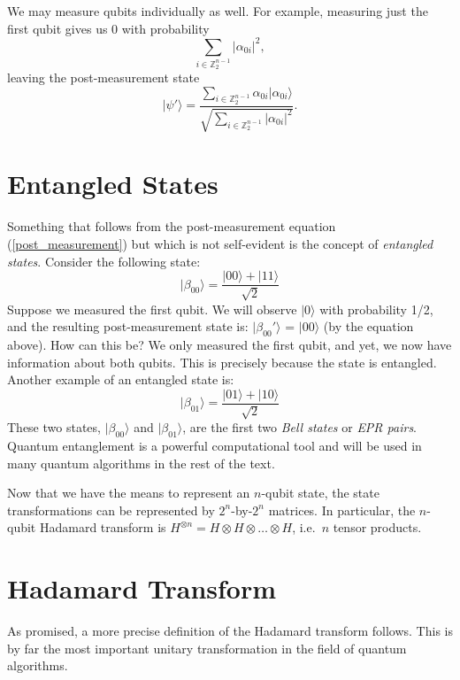 \documentclass[12pt,twoside]{reedthesis}
\theoremstyle{definition}
\newcommand{\Z}{\mathbb{Z}}
\newcommand{\ket}[1]{\ensuremath{\lvert #1\rangle}\xspace}
\begin{document}
We may measure qubits individually as well. For example, measuring just the first qubit gives us 0 with probability 
\begin{equation*}
 \sum_{i \in \Z_2^{n-1}} \lvert \alpha_{0i} \rvert ^2,
\end{equation*}
leaving the post-measurement state
\begin{equation} \label{post_measurement}
 \ket{\psi'} = \frac{\sum_{i \in \Z_2^{n-1}} \alpha_{0i} \ket{\alpha_{0i}}}{\sqrt{\sum_{i \in \Z_2^{n-1}} \lvert \alpha_{0i} \rvert ^2}}.
\end{equation}

\section{Entangled States}

Something that follows from the post-measurement equation (\ref{post_measurement}) but which is not self-evident is the concept of \textit{entangled states}. Consider the following state:
\begin{equation*}
\ket{\beta_{00}} = \frac{\ket{00} + \ket{11}}{\sqrt{2}}
\end{equation*}
Suppose we measured the first qubit. We will observe \ket{0} with probability 1/2, and the resulting post-measurement state is: \ket{\beta_{00}'} = \ket{00} (by the equation above). How can this be? We only measured the first qubit, and yet, we now have information about both qubits. This is precisely because the state is entangled. Another example of an entangled state is:
\begin{equation*}
\ket{\beta_{01}} = \frac{\ket{01} + \ket{10}}{\sqrt{2}}
\end{equation*}
These two states, \ket{\beta_{00}} and \ket{\beta_{01}}, are the first two \textit{Bell states} or \textit{EPR pairs}. Quantum entanglement is a powerful computational tool and will be used in many quantum algorithms in the rest of the text. 

Now that we have the means to represent an $n$-qubit state, the state transformations can be represented by $2^n$-by-$2^n$ matrices. In particular, the $n$-qubit Hadamard transform is $H^{\otimes n} = H \otimes H \otimes \ldots \otimes H$, i.e.~$n$ tensor products.

\section{Hadamard Transform}

As promised, a more precise definition of the Hadamard transform follows. This is by far the most important unitary transformation in the field of quantum algorithms.
\end{document}
